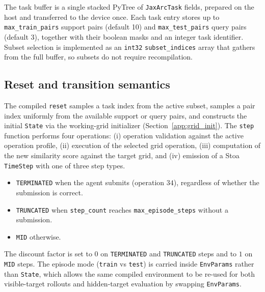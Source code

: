 The task buffer is a single stacked PyTree of \texttt{JaxArcTask} fields, prepared on the host and transferred to the device once. Each task entry stores up to \texttt{max\_train\_pairs} support pairs (default 10) and \texttt{max\_test\_pairs} query pairs (default 3), together with their boolean masks and an integer task identifier. Subset selection is implemented as an \texttt{int32} \texttt{subset\_indices} array that gathers from the full buffer, so subsets do not require recompilation.

\subsection{Reset and transition semantics}
\label{app:reset_and_step}

The compiled \texttt{reset} samples a task index from the active subset, samples a pair index uniformly from the available support or query pairs, and constructs the initial \texttt{State} via the working-grid initializer (Section~\ref{app:grid_init}). The \texttt{step} function performs four operations: (i) operation validation against the active operation profile, (ii) execution of the selected grid operation, (iii) computation of the new similarity score against the target grid, and (iv) emission of a Stoa \citep{toledoStoaJAXnativeInterface2025} \texttt{TimeStep} with one of three step types.

\begin{itemize}
    \item \texttt{TERMINATED} when the agent submits (operation $34$), regardless of whether the submission is correct.
    \item \texttt{TRUNCATED} when \texttt{step\_count} reaches \texttt{max\_episode\_steps} without a submission.
    \item \texttt{MID} otherwise.
\end{itemize}

The discount factor is set to $0$ on \texttt{TERMINATED} and \texttt{TRUNCATED} steps and to $1$ on \texttt{MID} steps. The episode mode (\texttt{train} vs \texttt{test}) is carried inside \texttt{EnvParams} rather than \texttt{State}, which allows the same compiled environment to be re-used for both visible-target rollouts and hidden-target evaluation by swapping \texttt{EnvParams}.


